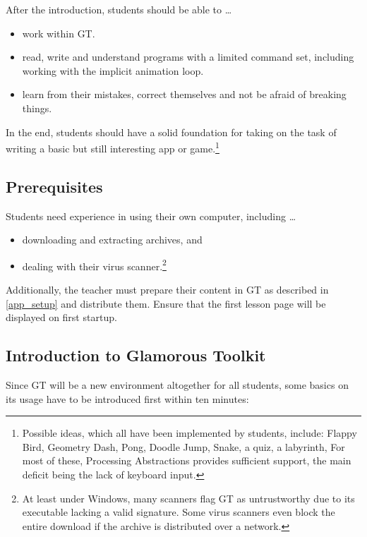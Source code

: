 After the introduction, students should be able to \dots
\begin{itemize}
\item work within \ac{GT}.
\item read, write and understand programs with a limited command set, including working with the implicit animation loop.
\item learn from their mistakes, correct themselves and not be afraid of breaking things.
\end{itemize}

In the end, students should have a solid foundation for taking on the task of writing a basic but still interesting app or game.\footnote{Possible ideas, which all have been implemented by students, include: Flappy Bird, Geometry Dash, Pong, Doodle Jump, Snake, a quiz, a labyrinth, \etc For most of these, Processing Abstractions provides sufficient support, the main deficit being the lack of keyboard input.}


\subsection{Prerequisites}

Students need experience in using their own computer, including \dots
\begin{itemize}
\item downloading and extracting archives, and
\item dealing with their virus scanner.\footnote{At least under Windows, many scanners flag \ac{GT} as untrustworthy due to its executable lacking a valid signature. Some virus scanners even block the entire download if the archive is distributed over a network.}
\end{itemize}

Additionally, the teacher must prepare their content in \ac{GT} \eg as described in \ref{app_setup} and distribute them. Ensure that the first lesson page will be displayed on first startup.


\subsection{Introduction to Glamorous Toolkit} \label{ssc_lesson_gt}

Since \ac{GT} will be a new environment altogether for all students, some basics on its usage have to be introduced first within ten minutes:

